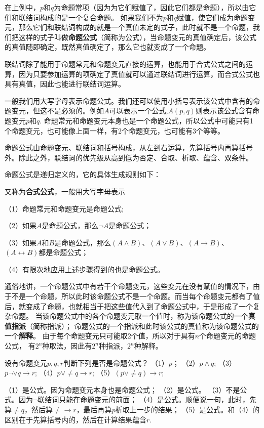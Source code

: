 在上例中，$p$和$q$为命题常项（因为为它们赋值了，因此它们都是命题），所以由它们和联结词构成的是一个复合命题。
如果我们不为$p$和$q$赋值，使它们成为命题变元，那么它们和联结词构成的就是一个真值未定的式子，此时就不是一个命题，我们把这样的式子叫做\textbf{命题公式}（简称为公式），当命题变元的真值确定后，该公式的真值随即确定，既然真值确定了，那么它也就变成了一个命题。

联结词除了能用于命题常元和命题变元直接的运算，也能用于合式公式之间的运算，因为只要参加运算的项确定了真值就可以通过联结词进行运算，而合式公式也具有真值，因此也能进行联结词运算。

一般我们用大写字母表示命题公式。我们还可以使用小括号表示该公式中含有的命题变元，但这不是必须的。例如$A$可以表示一个公式,$A(p,q)$则表示该公式含有命题变元$p$和$q$.
命题常元和命题变元本身也是一个命题公式，所以公式中可能只有1个命题变元，也可能像上面一样，有2个命题变元，也可能有3个等等。

命题公式由命题变元、联结词和括号构成，从左到右运算，先算括号内再算括号外。除此之外，联结词的优先级从高到低为否定、合取、析取、蕴含、双条件。

命题公式是递归定义的，它的具体生成规则如下：
\begin{definition}[命题公式]
    又称为\textbf{合式公式}，一般用大写字母表示

    （1）命题常元和命题变元是命题公式;

    （2）如果$A$是命题公式，那么$\neg A$是命题公式；

    （3）如果$A$和$B$是命题公式，那么$(A \wedge B)$、$(A \vee B)$、$(A \to B)$、$(A \leftrightarrow B)$都是命题公式；
    
    （4）有限次地应用上述步骤得到的也是命题公式。
\end{definition}

通俗地讲，一个命题公式中有若干个命题变元，这些变元在没有赋值的情况下，由于不是一个命题，所以此时该命题公式不是一个命题。而当每个命题变元都有了值后，就变成了命题，也就相当于把这些值代入到了命题公式中，于是形成了一个复杂命题。
当该命题公式中的各个命题变元取一个值时，称为该命题公式的一个\textbf{真值指派}（简称指派）；
命题公式的一个指派和此时该公式的真值称为该命题公式的一个\textbf{解释}。
由于每个命题变元只可能取2个值，所以对于具有$n$个命题变元的命题公式，
有$2^n$种取法，因此有$2^n$种指派，$2^n$种解释。

\begin{example}
    设有命题变元$p,q,r$判断下列是否是命题公式？
    （1）$p$；
    （2）$p \wedge q$;
    （3）$p \neg \vee q \to r$;
    （4）$p \vee \neq q \to r$;
    （5）$(p \vee \neq q) \to r$;
\end{example}
\begin{solution}
    （1）是公式。因为命题变元本身也是命题公式；
    （2）是公式。
    （3）不是公式。因为$\neg$联结词只能在命题变元的前面；
    （4）是公式。顺便说一句，此时，先算$\neq q$，然后算$\neq \to r$，最后再算$p$析取上一步的结果；
    （5）是公式。和（4）的区别在于先算括号内的，然后在计算结果蕴含$r$.
\end{solution}

